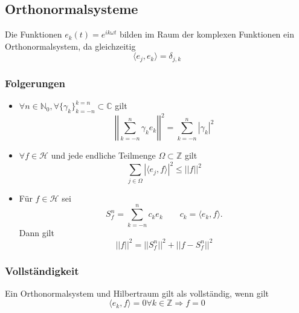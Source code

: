 \subsection{Orthonormalsysteme}
\begin{sectionbox}
    Die Funktionen $e_k(t)=e^{ik\omega t}$ bilden im Raum der komplexen Funktionen ein Orthonormalsystem, da gleichzeitig
    \begin{equation*}
        \langle e_j,e_k\rangle = \delta_{j,k}
    \end{equation*}

    \subsubsection{Folgerungen}
    \begin{itemize}
        \item $\forall n \in \mathbb N_0, \forall \{\gamma_k\}_{k=-n}^{k=n} \subset\mathbb C$ gilt
              \begin{equation*}
                  \left|\left| \sum_{k=-n}^{n}\gamma_ke_k \right|\right|^2 = \sum_{k=-n}^{n}|\gamma_k|^2
              \end{equation*}
        \item $\forall f \in \mathcal{H}$ und jede endliche Teilmenge $\Omega \subset\mathbb Z$ gilt
              \begin{equation*}
                  \sum_{j\in\Omega}|\langle e_j, f\rangle|^2 \le ||f||^2
              \end{equation*}
        \item Für $f\in\mathcal{H}$ sei
              \begin{equation*}
                  S_f^n=\sum_{k=-n}^{n}c_ke_k \qquad c_k=\langle e_k, f\rangle.
              \end{equation*} Dann gilt
              \begin{equation*}
                  ||f||^2 = ||S_f^n||^2 + ||f-S_f^n||^2
              \end{equation*}
    \end{itemize}

    \subsubsection{Vollständigkeit}
    Ein Orthonormalsystem und Hilbertraum gilt als vollständig, wenn gilt
    \begin{equation*}
        \langle e_k, f \rangle = 0 \forall k \in \mathbb Z \Longrightarrow f = 0
    \end{equation*}


\end{sectionbox}

